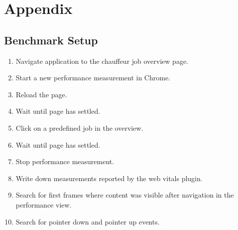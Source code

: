 \chapter*{Appendix}

\section*{Benchmark Setup}
\label{app:benchmark-setup}
\begin{enumerate}
    \item Navigate application to the chauffeur job overview page.
    \item Start a new performance measurement in Chrome.
    \item Reload the page.
    \item Wait until page has settled.
    \item Click on a predefined job in the overview.
    \item Wait until page has settled.
    \item Stop performance measurement.
    \item Write down measurements reported by the web vitals plugin. 
    \item Search for first frames where content was visible after navigation in the performance view.
    \item Search for pointer down and pointer up events.
\end{enumerate}